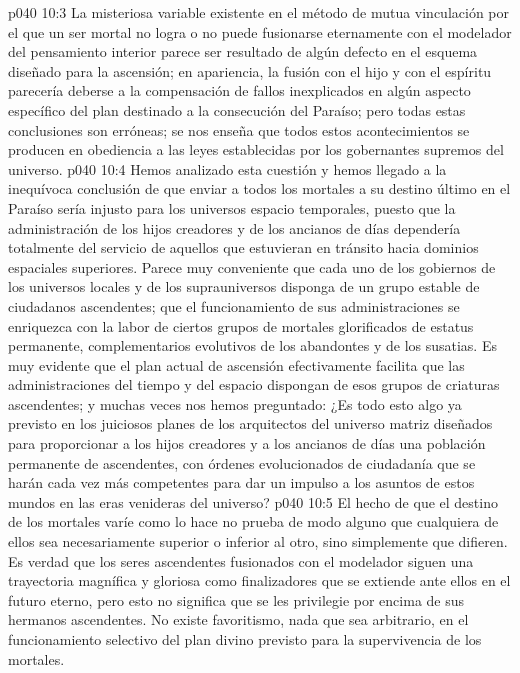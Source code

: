 \vs p040 10:3 \pc La misteriosa variable existente en el método de mutua vinculación por el que un ser mortal no logra o no puede fusionarse eternamente con el modelador del pensamiento interior parece ser resultado de algún defecto en el esquema diseñado para la ascensión; en apariencia, la fusión con el hijo y con el espíritu parecería deberse a la compensación de fallos inexplicados en algún aspecto específico del plan destinado a la consecución del Paraíso; pero todas estas conclusiones son erróneas; se nos enseña que todos estos acontecimientos se producen en obediencia a las leyes establecidas por los gobernantes supremos del universo.
\vs p040 10:4 Hemos analizado esta cuestión y hemos llegado a la inequívoca conclusión de que enviar a todos los mortales a su destino último en el Paraíso sería injusto para los universos espacio temporales, puesto que la administración de los hijos creadores y de los ancianos de días dependería totalmente del servicio de aquellos que estuvieran en tránsito hacia dominios espaciales superiores. Parece muy conveniente que cada uno de los gobiernos de los universos locales y de los suprauniversos disponga de un grupo estable de ciudadanos ascendentes; que el funcionamiento de sus administraciones se enriquezca con la labor de ciertos grupos de mortales glorificados de estatus permanente, complementarios evolutivos de los abandontes y de los susatias. Es muy evidente que el plan actual de ascensión efectivamente facilita que las administraciones del tiempo y del espacio dispongan de esos grupos de criaturas ascendentes; y muchas veces nos hemos preguntado: ¿Es todo esto algo ya previsto en los juiciosos planes de los arquitectos del universo matriz diseñados para proporcionar a los hijos creadores y a los ancianos de días una población permanente de ascendentes, con órdenes evolucionados de ciudadanía que se harán cada vez más competentes para dar un impulso a los asuntos de estos mundos en las eras venideras del universo?
\vs p040 10:5 \pc El hecho de que el destino de los mortales varíe como lo hace no prueba de modo alguno que cualquiera de ellos sea necesariamente superior o inferior al otro, sino simplemente que difieren. Es verdad que los seres ascendentes fusionados con el modelador siguen una trayectoria magnífica y gloriosa como finalizadores que se extiende ante ellos en el futuro eterno, pero esto no significa que se les privilegie por encima de sus hermanos ascendentes. No existe favoritismo, nada que sea arbitrario, en el funcionamiento selectivo del plan divino previsto para la supervivencia de los mortales.
